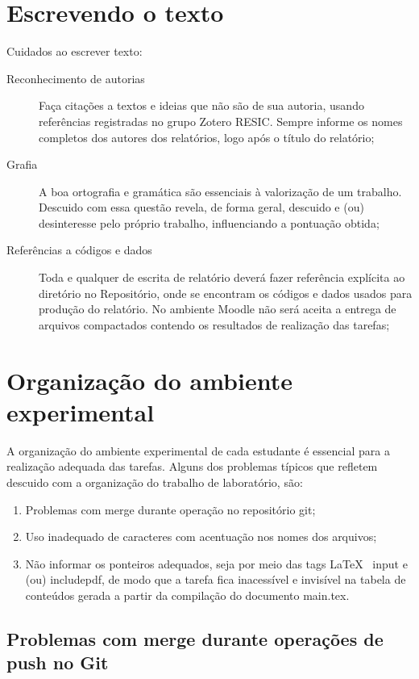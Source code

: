 \section{Escrevendo o texto}

Cuidados ao escrever texto:
\begin{description}
\item [Reconhecimento de autorias] Faça citações a textos e ideias que não são de sua autoria, usando referências registradas no grupo Zotero RESIC. Sempre informe os nomes completos dos autores dos relatórios, logo após o título do relatório;
\item [Grafia] A boa ortografia e gramática são essenciais à valorização de um trabalho. Descuido com essa questão revela, de forma geral, descuido e (ou) desinteresse pelo próprio trabalho, influenciando a pontuação obtida;
\item [Referências a códigos e dados] Toda e qualquer de escrita de relatório deverá fazer referência explícita ao diretório no Repositório, onde se encontram os códigos e dados usados para produção do relatório. No ambiente Moodle não será aceita a entrega de arquivos compactados contendo os resultados de realização das tarefas;
\end{description}

\section{Organização do ambiente experimental}

A organização do ambiente experimental de cada estudante é essencial para a realização adequada das tarefas.
Alguns dos problemas típicos que refletem descuido com a organização do trabalho de laboratório, são:

\begin{enumerate}
\item Problemas com merge durante operação no repositório git;
\item Uso inadequado de caracteres com acentuação nos nomes dos arquivos;
\item Não informar os ponteiros adequados, seja por meio das tags \LaTeX~ input e (ou) includepdf, de modo que a tarefa fica inacessível e invisível na tabela de conteúdos gerada a partir da compilação do documento main.tex.
\end{enumerate}

\subsection{Problemas com merge durante operações de push no Git}

